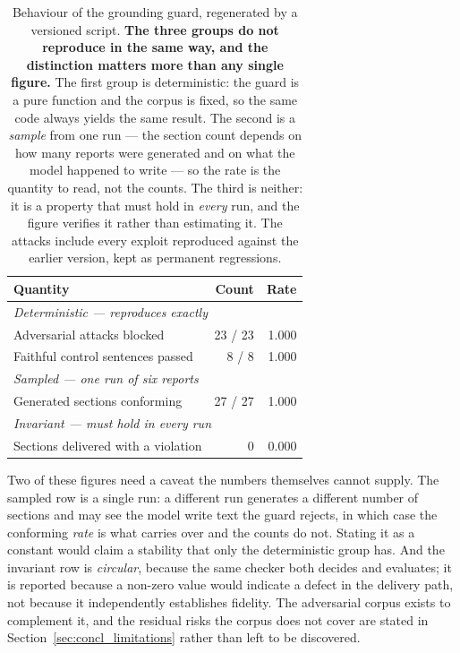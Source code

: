 \begin{table}[ht]
\centering
\caption[Measured behaviour of the grounding guard]{Behaviour of the grounding guard, regenerated by
a versioned script. \textbf{The three groups do not reproduce in the same way, and the distinction
matters more than any single figure.} The first group is deterministic: the guard is a pure
function and the corpus is fixed, so the same code always yields the same result. The second is a
\emph{sample} from one run --- the section count depends on how many reports were generated and on
what the model happened to write --- so the rate is the quantity to read, not the counts. The third
is neither: it is a property that must hold in \emph{every} run, and the figure verifies it rather
than estimating it. The attacks include every exploit reproduced against the earlier version, kept
as permanent regressions.}
\label{tab:guard_measured}
\begin{tabular}{lrr}
\toprule
Quantity & Count & Rate \\
\midrule
\multicolumn{3}{l}{\emph{Deterministic --- reproduces exactly}} \\
Adversarial attacks blocked         & 23 / 23 & 1.000 \\
Faithful control sentences passed   & 8 / 8   & 1.000 \\
\midrule
\multicolumn{3}{l}{\emph{Sampled --- one run of six reports}} \\
Generated sections conforming       & 27 / 27 & 1.000 \\
\midrule
\multicolumn{3}{l}{\emph{Invariant --- must hold in every run}} \\
Sections delivered with a violation & 0       & 0.000 \\
\bottomrule
\end{tabular}
\end{table}

Two of these figures need a caveat the numbers themselves cannot supply. The sampled row is a single
run: a different run generates a different number of sections and may see the model write text the
guard rejects, in which case the conforming \emph{rate} is what carries over and the counts do not.
Stating it as a constant would claim a stability that only the deterministic group has. And the
invariant row is \emph{circular}, because the same checker both decides and evaluates; it is
reported because a non-zero value would indicate a defect in the delivery path, not because it
independently establishes fidelity. The adversarial corpus exists to complement it, and the
residual risks the corpus does not cover are stated in Section~\ref{sec:concl_limitations} rather
than left to be discovered.

